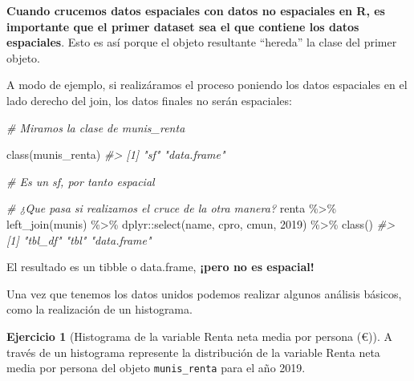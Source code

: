 \documentclass[
]{report}
\newenvironment{Shaded}{\begin{snugshade}}{\end{snugshade}}
\newcommand{\AttributeTok}[1]{\textcolor[rgb]{0.77,0.63,0.00}{#1}}
\newcommand{\CommentTok}[1]{\textcolor[rgb]{0.56,0.35,0.01}{\textit{#1}}}
\newcommand{\FunctionTok}[1]{\textcolor[rgb]{0.00,0.00,0.00}{#1}}
\newcommand{\NormalTok}[1]{#1}
\newcommand{\SpecialCharTok}[1]{\textcolor[rgb]{0.00,0.00,0.00}{#1}}
\newcommand{\StringTok}[1]{\textcolor[rgb]{0.31,0.60,0.02}{#1}}
\theoremstyle{definition}
\theoremstyle{definition}
\theoremstyle{definition}
\newtheorem{exercise}{Ejercicio}[chapter]
\theoremstyle{definition}
\theoremstyle{remark}
\begin{document}
\textbf{Cuando crucemos datos espaciales con datos no espaciales en R, es importante
que el primer dataset sea el que contiene los datos espaciales}. Esto es así
porque el objeto resultante ``hereda'' la clase del primer objeto.

A modo de ejemplo, si realizáramos el proceso poniendo los datos espaciales en
el lado derecho del join, los datos finales no serán espaciales:

\begin{Shaded}
\begin{Highlighting}[]

\CommentTok{\# Miramos la clase de munis\_renta}

\FunctionTok{class}\NormalTok{(munis\_renta)}
\CommentTok{\#\textgreater{} [1] "sf"         "data.frame"}

\CommentTok{\# Es un sf, por tanto espacial}

\CommentTok{\# ¿Que pasa si realizamos el cruce de la otra manera?}
\NormalTok{renta }\SpecialCharTok{\%\textgreater{}\%}
  \FunctionTok{left\_join}\NormalTok{(munis) }\SpecialCharTok{\%\textgreater{}\%}
\NormalTok{  dplyr}\SpecialCharTok{::}\FunctionTok{select}\NormalTok{(name, cpro, cmun, }\StringTok{\textasciigrave{}}\AttributeTok{2019}\StringTok{\textasciigrave{}}\NormalTok{) }\SpecialCharTok{\%\textgreater{}\%}
  \FunctionTok{class}\NormalTok{()}
\CommentTok{\#\textgreater{} [1] "tbl\_df"     "tbl"        "data.frame"}
\end{Highlighting}
\end{Shaded}

El resultado es un tibble o data.frame, \textbf{¡pero no es espacial!}

Una vez que tenemos los datos unidos podemos realizar algunos análisis básicos,
como la realización de un histograma.

\begin{exercise}[Histograma de la variable Renta neta media por persona (€)]
\protect\hypertarget{exr:ex19}{}\label{exr:ex19}A través de un histograma represente la distribución de la variable Renta neta
media por persona del objeto \texttt{munis\_renta} para el año 2019.
\end{exercise}
\end{document}

